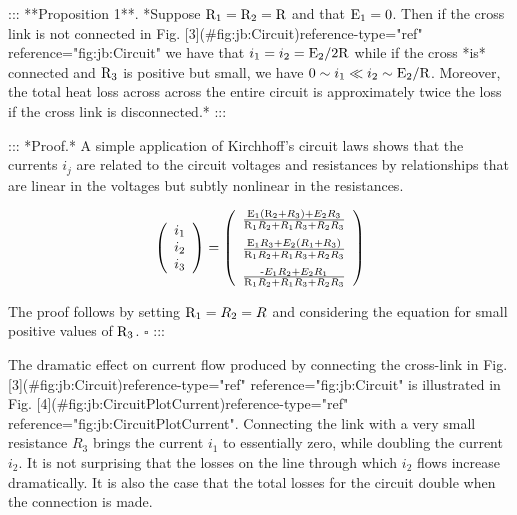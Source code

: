::: **Proposition 1**. *Suppose ${\textrm R_1}={\textrm R _2}={\textrm R}$ and that ${\textrm E_1}=0$. Then if the cross link is not connected in Fig. [3](#fig:jb:Circuit){reference-type="ref" reference="fig:jb:Circuit"} we have that $i_1=i_2={\textrm E_2}/2{\textrm R}$ while if the cross *is* connected and ${\textrm R_3}$ is positive but small, we have $0\sim i_1\ll i_2\sim {\textrm E_2}/{\textrm R}$. Moreover, the total heat loss across across the entire circuit is approximately twice the loss if the cross link is disconnected.* :::

::: *Proof.* A simple application of Kirchhoff's circuit laws shows that the currents $i_j$ are related to the circuit voltages and resistances by relationships that are linear in the voltages but subtly nonlinear in the resistances.

$$\left( \begin{array}{c} i_1\\ i_2\\ i_3 \\ \end{array} \right) = 
\left(\begin{array}{c} \frac{{\textrm E_1}({\textrm R_2+R_3) + E_2R_3}}{{\textrm R_1R_2+R_1R_3+R_2R_3}}\\[0.1in] \frac{{\textrm E_1R_3 + E_2(R_1+R_3)}}{{\textrm R_1R_2+R_1R_3+R_2R_3}}\\[0.1in] \frac{{\textrm -E_1R_2 + E_2R_1}}{{\textrm R_1R_2+R_1R_3+R_2R_3}}\\
 \end{array} \right) \label{eq:jb:Kirchhoff}$$

The proof follows by setting ${\textrm R_1=R_2=R}$ and considering the equation for small positive values of ${\textrm R_3}$. $\square$ :::

The dramatic effect on current flow produced by connecting the cross-link in Fig. [3](#fig:jb:Circuit){reference-type="ref" reference="fig:jb:Circuit"} is illustrated in Fig. [4](#fig:jb:CircuitPlotCurrent){reference-type="ref" reference="fig:jb:CircuitPlotCurrent"}. Connecting the link with a very small resistance $R_3$ brings the current $i_1$ to essentially zero, while doubling the current $i_2$. It is not surprising that the losses on the line through which $i_2$ flows increase dramatically. It is also the case that the total losses for the circuit double when the connection is made.


